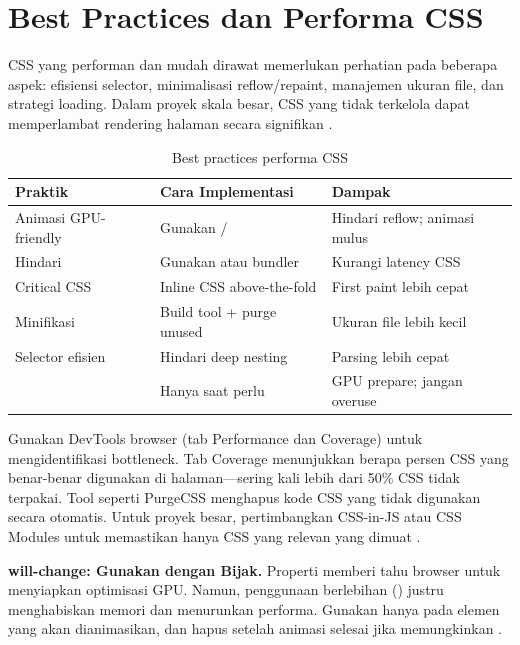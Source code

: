 ﻿\section{Best Practices dan Performa CSS}

CSS yang performan dan mudah dirawat memerlukan perhatian pada beberapa aspek: efisiensi selector, minimalisasi reflow/repaint, manajemen ukuran file, dan strategi loading. Dalam proyek skala besar, CSS yang tidak terkelola dapat memperlambat rendering halaman secara signifikan \cite{webdevCss}.

\begin{table}[H]
\centering
\begin{tabular}{|P{3.5cm}|P{4cm}|P{4.5cm}|}
\hline
\textbf{Praktik} & \textbf{Cara Implementasi} & \textbf{Dampak} \\
\hline
Animasi GPU-friendly & Gunakan / & Hindari reflow; animasi mulus \\
\hline
Hindari  & Gunakan  atau bundler & Kurangi latency CSS \\
\hline
Critical CSS & Inline CSS above-the-fold & First paint lebih cepat \\
\hline
Minifikasi & Build tool + purge unused & Ukuran file lebih kecil \\
\hline
Selector efisien & Hindari deep nesting & Parsing lebih cepat \\
\hline
{} & Hanya saat perlu & GPU prepare; jangan overuse \\
\hline
\end{tabular}
\caption{Best practices performa CSS}
\end{table}

Gunakan DevTools browser (tab Performance dan Coverage) untuk mengidentifikasi bottleneck. Tab Coverage menunjukkan berapa persen CSS yang benar-benar digunakan di halaman---sering kali lebih dari 50\% CSS tidak terpakai. Tool seperti PurgeCSS menghapus kode CSS yang tidak digunakan secara otomatis. Untuk proyek besar, pertimbangkan CSS-in-JS atau CSS Modules untuk memastikan hanya CSS yang relevan yang dimuat \cite{mdnCss}.

\begin{konsep}
\textbf{will-change: Gunakan dengan Bijak.} Properti  memberi tahu browser untuk menyiapkan optimisasi GPU. Namun, penggunaan berlebihan () justru menghabiskan memori dan menurunkan performa. Gunakan hanya pada elemen yang akan dianimasikan, dan hapus setelah animasi selesai jika memungkinkan \cite{webdevCss}.
\end{konsep}

